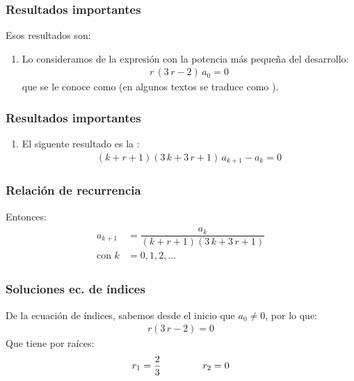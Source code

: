 \documentclass[12pt]{beamer}
\begin{document}
\begin{frame}
\frametitle{Resultados importantes}
Esos resultados son:
\begin{enumerate}
\item Lo consideramos de la expresión con la potencia más pequeña del desarrollo:
\begin{align*}
r \, (3 \, r - 2) \, a_{0} = 0
\end{align*}
que se le conoce como  (en algunos textos se traduce como ).
\seti
\end{enumerate}
\end{frame}
\begin{frame}
\frametitle{Resultados importantes}
\begin{enumerate}
\conti
\item El siguente resultado es la :
\begin{align*}
(k + r + 1)(3 \, k + 3 \, r + 1) \, a_{k+1} - a_{k} = 0
\end{align*}
\end{enumerate}
\end{frame}
\begin{frame}
\frametitle{Relación de recurrencia}
Entonces:
\pause
\begin{align}
\begin{aligned}
a_{k+1} &= \dfrac{a_{k}}{(k + r + 1)(3 \, k + 3 \, r + 1)} \\[0.5em]
\text{con } k &= 0, 1, 2, \ldots
\end{aligned}
\label{eq:ecuacion_07}
\end{align}
\end{frame}
\begin{frame}
\frametitle{Soluciones ec. de índices}
De la ecuación de índices, sabemos desde el inicio que $a_{0} \neq 0$, por lo que:
\pause
\begin{align}
r (3 \, r - 2) = 0
\label{eq:ecuacion_06}
\end{align}
\pause
Que tiene por raíces:
\pause
\begin{align*}
r_{1} = \dfrac{2}{3} \hspace{1.5cm} r_{2} = 0
\end{align*}
\end{frame}
\end{document}
